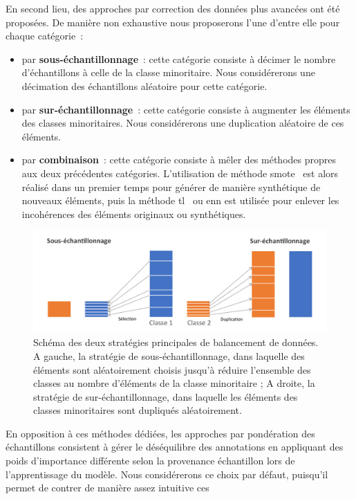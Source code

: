 En second lieu, des approches par correction des données plus avancées ont été proposées. De manière non exhaustive nous proposerons l'une d'entre elle pour chaque catégorie~:
\begin{itemize}
    \item par \textbf{sous-échantillonnage}~: cette catégorie consiste à décimer le nombre d'échantillons à celle de la classe minoritaire. Nous considérerons une décimation des échantillons aléatoire pour cette catégorie.
    \item par \textbf{sur-échantillonnage}~: cette catégorie consiste à augmenter les éléments des classes minoritaires. Nous considérerons une duplication aléatoire de ces éléments.
    \item par \textbf{combinaison}~: cette catégorie consiste à mêler des méthodes propres aux deux précédentes catégories. L'utilisation de méthode \gls{smote}~\cite{Chawla2002}  est alors réalisé dans un premier temps pour générer de manière synthétique de nouveaux éléments, puis la méthode \gls{tl}~\cite{Tomek1976} ou \gls{enn} est utilisée pour enlever les incohérences des éléments originaux ou synthétiques.
\end{itemize}\par

\begin{figure}[H]
    \centering
    \includegraphics[width=\linewidth]{contents/chapter_4/resources/scheme_data_balancing.pdf}
    \caption{Schéma des deux stratégies principales de balancement de données. A gauche, la stratégie de sous-échantillonnage, dans laquelle des éléments sont aléatoirement choisis jusqu'à réduire l'ensemble des classes au nombre d'éléments de la classe minoritaire ; A droite, la stratégie de sur-échantillonnage, dans laquelle les éléments des classes minoritaires sont dupliqués aléatoirement. }
    \label{fig:scheme_data_balancing}
\end{figure}\par

En opposition à ces méthodes dédiées, les approches par pondération des échantillons consistent à gérer le déséquilibre des annotations en appliquant des poids d'importance différente selon la provenance échantillon lors de l'apprentissage du modèle. Nous considérerons ce choix par défaut, puisqu'il permet de contrer de manière assez intuitive ces

